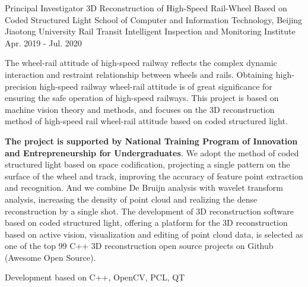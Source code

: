 \begin{cventries}
    \ecventry
    {Principal Investigator} %
    {3D Reconstruction of High-Speed Rail-Wheel \newline Based on Coded Structured Light \href{http://gjcxcy.bjtu.edu.cn/NewLXItemListForStudentDetail.aspx?ItemNo=594113&year=2020&type=student&IsLXItem=1}{{\color{awesome}\faLink}}
    } %
    {School of Computer and Information Technology, Beijing Jiaotong University\newline\vspace{-0.5mm}\hspace{-10mm} Rail Transit Intelligent Inspection and Monitoring Institute} %
    {Apr. 2019 - Jul. 2020} %
    {
        \begin{cvitems} %
            \item {The wheel-rail attitude of high-speed railway reflects the complex dynamic interaction and restraint relationship
            between wheels and rails. Obtaining high-precision high-speed railway wheel-rail attitude is of great significance for
            ensuring the safe operation of high-speed railways. This project is based on machine vision theory and methods, and focuses
            on the 3D reconstruction method of high-speed rail wheel-rail attitude based on coded structured light.}
            \item {\textbf{The project is supported by National Training Program of Innovation and Entrepreneurship for Undergraduates}.
            We adopt the method of coded structured light based on space codification, projecting a single pattern on the surface of the
            wheel and track, improving the accuracy of feature point extraction and recognition. And we combine De Bruijn analysis with
            wavelet transform analysis, increasing the density of point cloud and realizing the dense reconstruction by a single shot.
            The development of 3D reconstruction software based on coded structured light, offering a platform for the 3D reconstruction
            based on active vision, visualization and editing of point cloud data, is selected as one of the top 99 C++ 3D reconstruction
            open source projects on Github (Awesome Open Source). \href{https://github.com/Tang1705/Reconstruction}{{\color{awesome}\faGithub}}}
            \item {Development based on C++, OpenCV, PCL, QT}
        \end{cvitems}
    }
\end{cventries}
